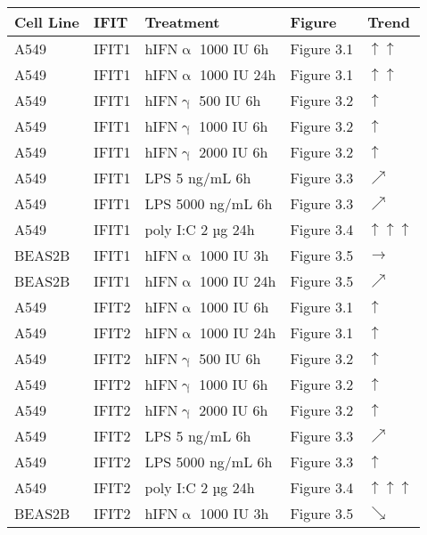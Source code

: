 \begin{table}
    \centering
    \begin{tabular}{lllll}
    \hline
        \textbf{Cell Line} & \textbf{IFIT} & \textbf{Treatment} & \textbf{Figure} & \textbf{Trend} \\ \hline
        A549 & IFIT1 & hIFN$\upalpha$ 1000 IU 6h & Figure 3.1 & \(\uparrow\)\(\uparrow\) \\ 
        A549 & IFIT1 & hIFN$\upalpha$ 1000 IU 24h & Figure 3.1 & \(\uparrow\)\(\uparrow\) \\ 
        A549 & IFIT1 & hIFN$\upgamma$ 500 IU 6h & Figure 3.2 & \(\uparrow\) \\ 
        A549 & IFIT1 & hIFN$\upgamma$ 1000 IU 6h & Figure 3.2 & \(\uparrow\) \\ 
        A549 & IFIT1 & hIFN$\upgamma$ 2000 IU 6h & Figure 3.2 & \(\uparrow\) \\ 
        A549 & IFIT1 & LPS 5 ng/mL 6h & Figure 3.3 & \(\nearrow\) \\ 
        A549 & IFIT1 & LPS 5000 ng/mL 6h & Figure 3.3 & \(\nearrow\) \\ 
        A549 & IFIT1 & poly I:C 2 µg 24h & Figure 3.4 & \(\uparrow\)\(\uparrow\)\(\uparrow\) \\ 
        BEAS2B & IFIT1 & hIFN$\upalpha$ 1000 IU 3h & Figure 3.5 & \(\rightarrow\) \\ 
        BEAS2B & IFIT1 & hIFN$\upalpha$ 1000 IU 24h & Figure 3.5 & \(\nearrow\) \\ 
        A549 & IFIT2 & hIFN$\upalpha$ 1000 IU 6h & Figure 3.1 & \(\uparrow\) \\ 
        A549 & IFIT2 & hIFN$\upalpha$ 1000 IU 24h & Figure 3.1 & \(\uparrow\) \\ 
        A549 & IFIT2 & hIFN$\upgamma$ 500 IU 6h & Figure 3.2 & \(\uparrow\) \\ 
        A549 & IFIT2 & hIFN$\upgamma$ 1000 IU 6h & Figure 3.2 & \(\uparrow\) \\ 
        A549 & IFIT2 & hIFN$\upgamma$ 2000 IU 6h & Figure 3.2 & \(\uparrow\) \\ 
        A549 & IFIT2 & LPS 5 ng/mL 6h & Figure 3.3 & \(\nearrow\) \\ 
        A549 & IFIT2 & LPS 5000 ng/mL 6h & Figure 3.3 & \(\uparrow\) \\ 
        A549 & IFIT2 & poly I:C 2 µg 24h & Figure 3.4 & \(\uparrow\)\(\uparrow\)\(\uparrow\) \\ 
        BEAS2B & IFIT2 & hIFN$\upalpha$ 1000 IU 3h & Figure 3.5 & \(\searrow\) \\ 

\end{tabular}
\end{table}
